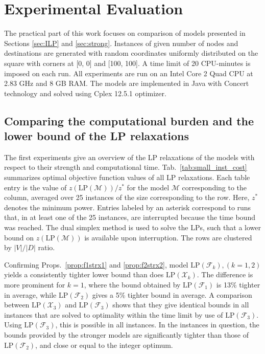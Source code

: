 \section{Experimental Evaluation}
\label{sec:exp}

The practical part of this work focuses on comparison of models presented in Sections \ref{sec:ILP} and \ref{sec:strong}.
Instances of given number of nodes and destinations are generated with random coordinates uniformly distributed on the square with corners at [0, 0] and [100, 100].
A time limit of 20 CPU-minutes is imposed on each run.
All experiments are run on an Intel Core 2 Quad CPU at 2.83 GHz and 8 GB RAM.
The models are implemented in Java with Concert technology and solved using Cplex 12.5.1 optimizer.
 
\subsection{Comparing the computational burden and the lower bound of the LP relaxations}
\label{sec:expcomplp}

The first experiments give an overview of the LP relaxations of the models with respect to their strength and computational time. 
Tab.\ \ref{tab:small_inst_cost} summarizes optimal objective function values of all LP relaxations.
Each table entry is the value of $z(\text{LP}(\mathcal{M}))/z^*$ for the model $\mathcal{M}$ corresponding to the column,
averaged over 25 instances of the size corresponding to the row.
Here, $z^*$ denotes the minimum power.
Entries labeled by an asterisk correspond to runs that, in at least one of the 25 instances, are interrupted because the time bound was reached.
The dual simplex method is used to solve the LPs, such that a lower bound on $z(\text{LP}(\mathcal{M}))$ is available upon interruption.
The rows are clustered by $|V|/|D|$ ratio.

Confirming Props.\ \ref{prop:f1strx1} and \ref{prop:f2strx2}, model $\text{LP}(\mathcal{F}_k), (k=1,2)$ yields a consistently tighter lower bound than does $\text{LP}(\mathcal{X}_k)$. 
The difference is more prominent for $k=1$, where the bound obtained by $\text{LP}(\mathcal{F}_1)$ is 13\% tighter in average, while $\text{LP}(\mathcal{F}_2)$ gives a 5\% tighter bound in average.
A comparison between $\text{LP}(\mathcal{X}_3)$ and $\text{LP}(\mathcal{F}_3)$ shows that they give identical bounds in all instances that are solved to optimality within the time limit by use of
$\text{LP}(\mathcal{F}_3)$.
Using $\text{LP}(\mathcal{F}_3)$, this is possible in all instances.
In the instances in question, the bounds provided by the stronger models are significantly tighter than those of $\text{LP}(\mathcal{F}_2)$, and close or equal to the integer optimum.

